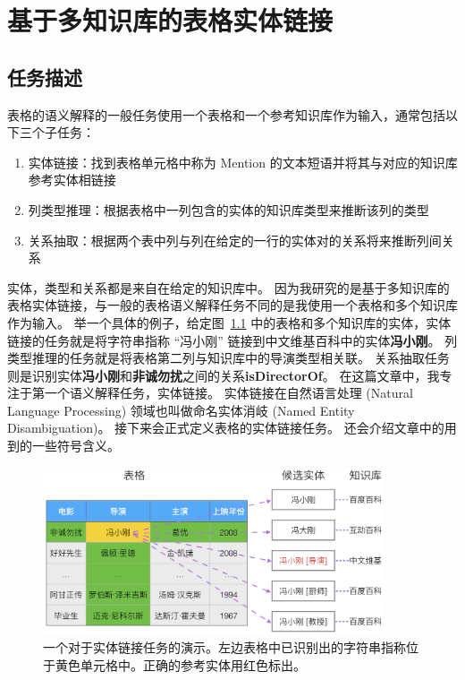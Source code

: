\chapter{基于多知识库的表格实体链接}

\section{任务描述}\label{task}

表格的语义解释的一般任务使用一个表格和一个参考知识库作为输入，通常包括以下三个子任务：

\begin{enumerate}[1.]
\item 实体链接：找到表格单元格中称为 Mention 的文本短语并将其与对应的知识库参考实体相链接
\item 列类型推理：根据表格中一列包含的实体的知识库类型来推断该列的类型
\item 关系抽取：根据两个表中列与列在给定的一行的实体对的关系将来推断列间关系
\end{enumerate}

实体，类型和关系都是来自在给定的知识库中。
因为我研究的是基于多知识库的表格实体链接，与一般的表格语义解释任务不同的是我使用一个表格和多个知识库作为输入。
举一个具体的例子，给定图~\ref{el} 中的表格和多个知识库的实体，实体链接的任务就是将字符串指称 ``冯小刚'' 链接到中文维基百科中的实体\textbf{冯小刚}。
列类型推理的任务就是将表格第二列与知识库中的导演类型相关联。
关系抽取任务则是识别实体\textbf{冯小刚}和\textbf{非诚勿扰}之间的关系\textbf{isDirectorOf}。
在这篇文章中，我专注于第一个语义解释任务，实体链接。
实体链接在自然语言处理 (Natural Language Processing) 领域也叫做命名实体消岐 (Named Entity Disambiguation)。
接下来会正式定义表格的实体链接任务。
还会介绍文章中的用到的一些符号含义。\newline\par

\begin{figure}[htbp]
\centering
\includegraphics[width=0.9\textwidth]{img/el}
\caption{一个对于实体链接任务的演示。左边表格中已识别出的字符串指称位于黄色单元格中。正确的参考实体用红色标出。}
\label{el}
\end{figure}

